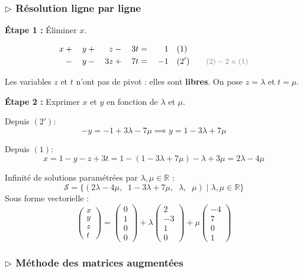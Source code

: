 \documentclass[12pt,a4paper]{article}
\newcommand{\ann}[1]{\qquad\textcolor{opcolor}{\text{\small #1}}}
\begin{document}
\subsubsection*{$\triangleright$ Résolution ligne par ligne}

\textbf{Étape 1 :} Éliminer $x$.

\begin{alignat*}{5}
  x &{}+{}& y  &{}+{}& z   &{}-{}& 3t &{}={}& 1  &\quad (1)\\
    &{}-{}& y  &{}-{}& 3z  &{}+{}& 7t &{}={}& -1 &\quad (2') \ann{$(2)-2\times(1)$}
\end{alignat*}

Les variables $z$ et $t$ n'ont pas de pivot : elles sont \textbf{libres}. On pose $z = \lambda$ et $t = \mu$.

\textbf{Étape 2 :} Exprimer $x$ et $y$ en fonction de $\lambda$ et $\mu$.

Depuis $(2')$:
\[
-y = -1 + 3\lambda - 7\mu \implies y = 1 - 3\lambda + 7\mu
\]

Depuis $(1)$:
\[
x = 1 - y - z + 3t = 1 - (1-3\lambda+7\mu) - \lambda + 3\mu = 2\lambda - 4\mu
\]

\begin{solbox}
Infinité de solutions paramétrées par $\lambda, \mu \in \mathbb{R}$ :
\[
\mathcal{S} = \bigl\{(2\lambda-4\mu,\;\; 1-3\lambda+7\mu,\;\; \lambda,\;\; \mu) \mid \lambda, \mu \in \mathbb{R}\bigr\}
\]
Sous forme vectorielle :
\[
\begin{pmatrix} x \\ y \\ z \\ t \end{pmatrix}
= \begin{pmatrix} 0 \\ 1 \\ 0 \\ 0 \end{pmatrix}
+ \lambda \begin{pmatrix} 2 \\ -3 \\ 1 \\ 0 \end{pmatrix}
+ \mu \begin{pmatrix} -4 \\ 7 \\ 0 \\ 1 \end{pmatrix}
\]
\end{solbox}

\subsubsection*{$\triangleright$ Méthode des matrices augmentées}
\end{document}
